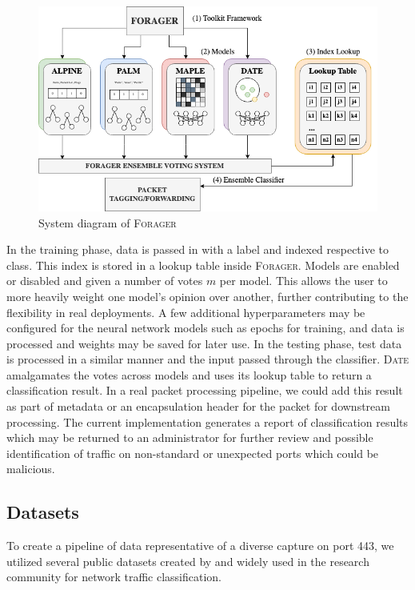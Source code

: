 \begin{figure} [ht!]
\centering
\includegraphics[scale=0.5]{chapters/7/img/forager.png}
\caption{System diagram of \textsc{Forager}}
\label{fig:forager}
\end{figure}

In the training phase, data is passed in with a label and indexed respective to class. This index is stored in a lookup table inside \textsc{Forager}. Models are enabled or disabled and given a number of votes $m$ per model. This allows the user to more heavily weight one model's opinion over another, further contributing to the flexibility in real deployments. A few additional hyperparameters may be configured for the neural network models such as epochs for training, and data is processed and weights may be saved for later use. In the testing phase, test data is processed in a similar manner and the input passed through the classifier. \textsc{Date} amalgamates the votes across models and uses its lookup table to return a classification result. In a real packet processing pipeline, we could add this result as part of metadata or an encapsulation header for the packet for downstream processing. The current implementation generates a report of classification results which may be returned to an administrator for further review and possible identification of traffic on non-standard or unexpected ports which could be malicious.

\subsection{Datasets}
To create a pipeline of data representative of a diverse capture on port 443, we utilized several public datasets created by and widely used in the research community for network traffic classification.

